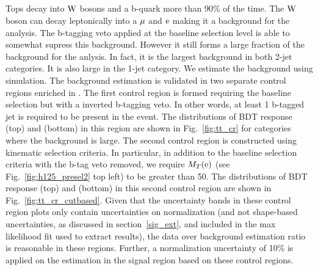 \subsection{\ttb}
\label{h125_ttb}
Tops decay into $\text{W}$ bosons and a b-quark more than 90\% of the time. The $\text{W}$ boson can decay leptonically into a $\mu$ and $\text{e}$ making it a background for the analysis. The b-tagging veto applied at the baseline selection level is able to somewhat supress this background. However it still forms a large fraction of the background for the anlysis. In fact, it is the largest background in both 2-jet categories. It is also large in the 1-jet category. We estimate the \ttb background using simulation. The background estimation is validated in two separate control regions enriched in \ttb. The first control region is formed requiring the baseline selection but with a inverted b-tagging veto. In other words, at least 1 b-tagged jet is required to be present in the event. The distributions of BDT response (top) and \mcol (bottom) in this region are shown in Fig.~\ref{fig:tt_cr} for categories where the \ttb background is large. The second control region is constructed using kinematic selection criteria. In particular, in addition to the baseline selection criteria with the b-tag veto removed, we require $M_T(\text{e})$ (see Fig.~\ref{fig:h125_presel2} top left) to be greater than 50\GeV. The distributions of BDT response (top) and \mcol (bottom) in this second control region are shown in Fig.~\ref{fig:tt_cr_cutbased}. Given that the uncertainty bands in these control region plots only contain uncertainties on normalization (and not shape-based uncertainties, as discussed in section~\ref{sig_ext}, and included in the max likelihood fit used to extract results), the data over background estimation  ratio is reasonable in these regions. Further, a normalization uncertainty of 10\% is applied on the \ttb estimation in the signal region based on these control regions.


